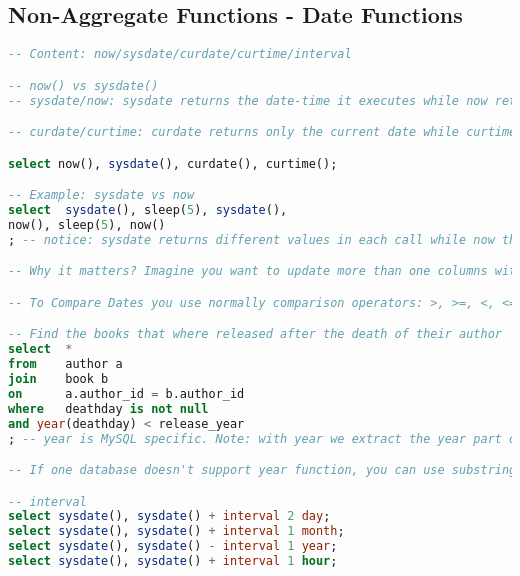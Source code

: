 \subsection{Non-Aggregate Functions - Date Functions}
\begin{lstlisting}[language=SQL]
-- Content: now/sysdate/curdate/curtime/interval

-- now() vs sysdate()
-- sysdate/now: sysdate returns the date-time it executes while now returns a constant time, at which the statement began to execute

-- curdate/curtime: curdate returns only the current date while curtime only the current timestamp

select now(), sysdate(), curdate(), curtime();

-- Example: sysdate vs now
select	sysdate(), sleep(5), sysdate(),
now(), sleep(5), now()
; -- notice: sysdate returns different values in each call while now the same timestamp

-- Why it matters? Imagine you want to update more than one columns with current datetime but the query takes time to complete, there will be small difference in timestamp between the two dates, so in such cases now is more suitable

-- To Compare Dates you use normally comparison operators: >, >=, <, <=, =

-- Find the books that where released after the death of their author
select	*
from	author a
join	book b
on		a.author_id = b.author_id
where	deathday is not null
and year(deathday) < release_year
; -- year is MySQL specific. Note: with year we extract the year part of the date since release_year is just the year we can't directly compare these without year

-- If one database doesn't support year function, you can use substring to extract only the part you need

-- interval
select sysdate(), sysdate() + interval 2 day;
select sysdate(), sysdate() + interval 1 month;
select sysdate(), sysdate() - interval 1 year;
select sysdate(), sysdate() + interval 1 hour;
\end{lstlisting}
